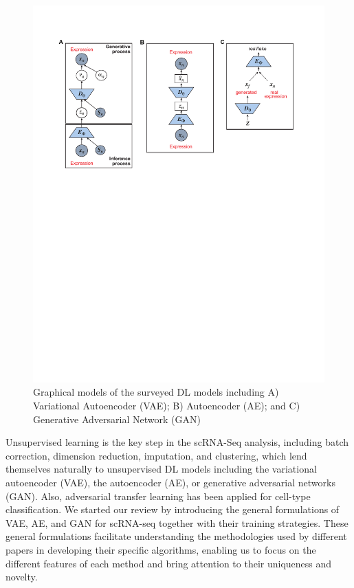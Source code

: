 \documentclass[
]{book}
\begin{document}
\begin{figure}

{\centering \includegraphics[width=21.28in]{Figures/Figure2} 

}

\caption{Graphical models of the surveyed DL models including A) Variational Autoencoder (VAE); B) Autoencoder (AE); and C) Generative Adversarial Network (GAN)}\label{fig:Figure2}
\end{figure}

Unsupervised learning is the key step in the scRNA-Seq analysis, including batch correction, dimension reduction, imputation, and clustering, which lend themselves naturally to unsupervised DL models including the variational autoencoder (VAE), the autoencoder (AE), or generative adversarial networks (GAN). Also, adversarial transfer learning has been applied for cell-type classification. We started our review by introducing the general formulations of VAE, AE, and GAN for scRNA-seq together with their training strategies. These general formulations facilitate understanding the methodologies used by different papers in developing their specific algorithms, enabling us to focus on the different features of each method and bring attention to their uniqueness and novelty.
\end{document}

